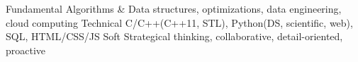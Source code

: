 

\begin{cvskills}
  \cvskill
    {Fundamental} %
    {Algorithms \& Data structures, optimizations, data engineering, cloud computing} %
  \cvskill
    {Technical} %
    {C/C++(C++11, STL), Python(DS, scientific, web), SQL, HTML/CSS/JS} %
  \cvskill
    {Soft} %
    {Strategical thinking, collaborative, detail-oriented, proactive} %

\end{cvskills}
